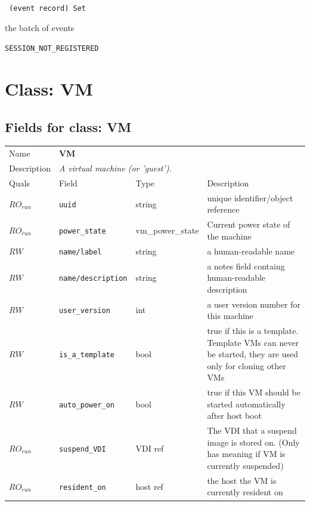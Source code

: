 {\tt 
(event record) Set
}


the batch of events
\vspace{0.3cm}

 {\tt SESSION\_NOT\_REGISTERED}

\vspace{0.6cm}

\vspace{1cm}
\newpage
\section{Class: VM}
\subsection{Fields for class: VM}
\begin{longtable}{|lllp{}|}
\hline
\multicolumn{1}{|l}{Name} & \multicolumn{3}{l|}{\bf VM} \\
\multicolumn{1}{|l}{Description} & \multicolumn{3}{l|}{\parbox{11cm}{\em A
virtual machine (or 'guest').}} \\
\hline
Quals & Field & Type & Description \\
\hline
$\mathit{RO}_\mathit{run}$ &  {\tt uuid} & string & unique identifier/object reference \\
$\mathit{RO}_\mathit{run}$ &  {\tt power\_state} & vm\_power\_state & Current power state of the machine \\
$\mathit{RW}$ &  {\tt name/label} & string & a human-readable name \\
$\mathit{RW}$ &  {\tt name/description} & string & a notes field containg human-readable description \\
$\mathit{RW}$ &  {\tt user\_version} & int & a user version number for this machine \\
$\mathit{RW}$ &  {\tt is\_a\_template} & bool & true if this is a template. Template VMs can never be started, they are used only for cloning other VMs \\
$\mathit{RW}$ &  {\tt auto\_power\_on} & bool & true if this VM should be started automatically after host boot \\
$\mathit{RO}_\mathit{run}$ &  {\tt suspend\_VDI} & VDI ref & The VDI that a suspend image is stored on. (Only has meaning if VM is currently suspended) \\
$\mathit{RO}_\mathit{run}$ &  {\tt resident\_on} & host ref & the host the VM is currently resident on \\

\end{longtable}
